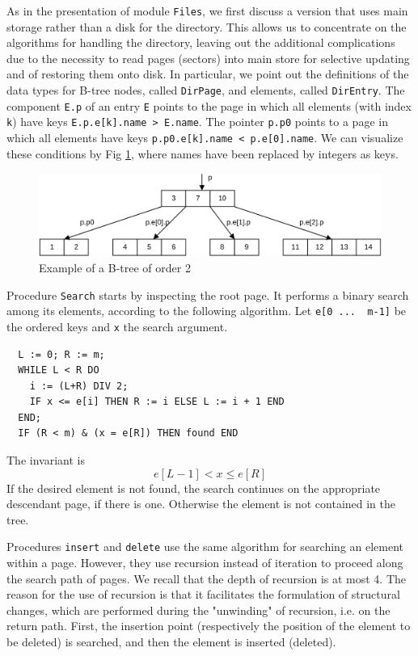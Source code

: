 As in the presentation of module \verb|Files|, we first discuss a version that uses main storage rather
than a disk for the directory. This allows us to concentrate on the algorithms for handling the
directory, leaving out the additional complications due to the necessity to read pages (sectors) into
main store for selective updating and of restoring them onto disk. In particular, we point out the
definitions of the data types for B-tree nodes, called \verb|DirPage|, and elements, called
\verb|DirEntry|.  The component \verb|E.p| of an entry \verb|E| points to the page in which all elements
(with index \verb|k|) have keys \verb|E.p.e[k].name > E.name|. The pointer \verb|p.p0| points to a page
in which all elements have keys \verb|p.p0.e[k].name < p.e[0].name|. We can visualize these conditions
by Fig \ref{fig:b-tree}, where names have been replaced by integers as keys.
\begin{figure}
  \label{fig:b-tree}
  \centering
  \includegraphics[width=\textwidth]{i/n}
  \caption{Example of a B-tree of order 2}
\end{figure}

Procedure \verb|Search| starts by inspecting the root page. It performs a binary search among its
elements, according to the following algorithm. Let \verb|e[0 ...  m-1]| be the ordered keys and
\verb|x| the search argument.
\begin{verbatim}
  L := 0; R := m;
  WHILE L < R DO
    i := (L+R) DIV 2;
    IF x <= e[i] THEN R := i ELSE L := i + 1 END
  END;
  IF (R < m) & (x = e[R]) THEN found END
\end{verbatim}

The invariant is
\[ e[L-1] < x \leq e[R] \]
If the desired element is not found, the search continues on the appropriate descendant page, if
there is one. Otherwise the element is not contained in the tree.

Procedures \verb|insert| and \verb|delete| use the same algorithm for searching an element within a
page.  However, they use recursion instead of iteration to proceed along the search path of pages. We
recall that the depth of recursion is at most 4. The reason for the use of recursion is that it
facilitates the formulation of structural changes, which are performed during the "unwinding" of
recursion, i.e. on the return path. First, the insertion point (respectively the position of the element
to be deleted) is searched, and then the element is inserted (deleted).

